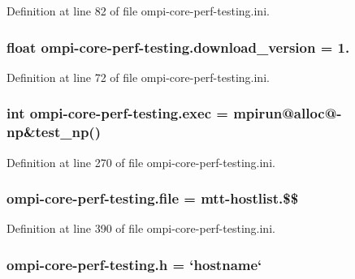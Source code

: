 Definition at line 82 of file ompi-\/core-\/perf-\/testing.\-ini.

\hypertarget{namespaceompi-core-perf-testing_a74b2c9b82adde122ece307aaf00bff28}{
\subsubsection[{download\-\_\-version}]{\setlength{\rightskip}{0pt plus 5cm}float ompi-\/core-\/perf-\/testing.\-download\-\_\-version = 1.}}\label{namespaceompi-core-perf-testing_a74b2c9b82adde122ece307aaf00bff28}


Definition at line 72 of file ompi-\/core-\/perf-\/testing.\-ini.

\hypertarget{namespaceompi-core-perf-testing_af852fdd97d7de2e0bce32ec64104df81}{
\subsubsection[{exec}]{\setlength{\rightskip}{0pt plus 5cm}int ompi-\/core-\/perf-\/testing.\-exec = mpirun@{\bf alloc}@-\/{\bf np}\&test\-\_\-np()}}\label{namespaceompi-core-perf-testing_af852fdd97d7de2e0bce32ec64104df81}


Definition at line 270 of file ompi-\/core-\/perf-\/testing.\-ini.

\hypertarget{namespaceompi-core-perf-testing_ad75cfc8b0adfe42041110d8fcf748e79}{
\subsubsection[{file}]{\setlength{\rightskip}{0pt plus 5cm}ompi-\/core-\/perf-\/testing.\-file = mtt-\/hostlist.\$\$}}\label{namespaceompi-core-perf-testing_ad75cfc8b0adfe42041110d8fcf748e79}


Definition at line 390 of file ompi-\/core-\/perf-\/testing.\-ini.

\hypertarget{namespaceompi-core-perf-testing_a288ab27bb997a5db5f291de283963be0}{
\subsubsection[{h}]{\setlength{\rightskip}{0pt plus 5cm}ompi-\/core-\/perf-\/testing.\-h = `hostname`}}\label{namespaceompi-core-perf-testing_a288ab27bb997a5db5f291de283963be0}



